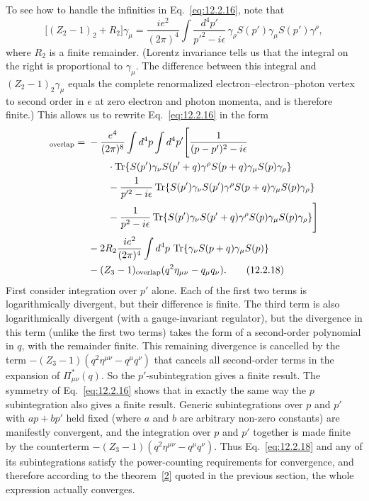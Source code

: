 To see how to handle the infinities in Eq.~\eqref{eq:12.2.16}, note that
\begin{equation}
  \bigl[(Z_2-1)_2+R_2\bigr]\gamma_\mu
  =\frac{i e^2}{(2\pi)^4}\int\frac{d^4p'}{p'^2-i\epsilon}\,
  \gamma_\rho S(p')\gamma_\mu S(p')\gamma^\rho,
  \tag{12.2.17}\label{eq:12.2.17}
\end{equation}
where $R_2$ is a finite remainder. (Lorentz invariance tells us that the
integral on the right is proportional to $\gamma_\mu$. The difference
between this integral and $(Z_2-1)_2\gamma_\mu$ equals the complete
renormalized electron--electron--photon vertex to second order in $e$ at
zero electron and photon momenta, and is therefore finite.) This allows us
to rewrite Eq.~\eqref{eq:12.2.16} in the form
\begin{align}
 [\Pi_{\mu\nu}^*(q)]_{\mathrm{overlap}}
 ={}&-\frac{e^4}{(2\pi)^8}\int d^4p\int d^4p'
 \Biggl[
 \frac{1}{(p-p')^2-i\epsilon}
 \notag\\
 &\qquad\cdot
 \operatorname{Tr}\!\left\{S(p')\gamma_\nu S(p'+q)\gamma^\rho
 S(p+q)\gamma_\mu S(p)\gamma_\rho\right\}
 \notag\\
 &\qquad-\frac{1}{p'^2-i\epsilon}
 \operatorname{Tr}\!\left\{S(p')\gamma_\nu S(p')\gamma^\rho
 S(p+q)\gamma_\mu S(p)\gamma_\rho\right\}
 \notag\\
 &\qquad-\frac{1}{p^2-i\epsilon}
 \operatorname{Tr}\!\left\{S(p')\gamma_\nu S(p'+q)\gamma^\rho
 S(p)\gamma_\mu S(p)\gamma_\rho\right\}
 \Biggr]
 \notag\\
 &-2R_2\frac{i e^2}{(2\pi)^4}\int d^4p\,
 \operatorname{Tr}\!\left\{\gamma_\nu S(p+q)\gamma_\mu S(p)\right\}
 \notag\\
 &-(Z_3-1)_{\mathrm{overlap}}
 (q^2\eta_{\mu\nu}-q_\mu q_\nu).
 \tag{12.2.18}\label{eq:12.2.18}
\end{align}
First consider integration over $p'$ alone. Each of the first two terms is
logarithmically divergent, but their difference is finite. The third term is
also logarithmically divergent (with a gauge-invariant regulator), but the
divergence in this term (unlike the first two terms) takes the form of a
second-order polynomial in $q$, with the remainder finite. This remaining
divergence is cancelled by the term
$-(Z_3-1)(q^2\eta^{\mu\nu}-q^\mu q^\nu)$ that cancels all second-order terms
in the expansion of $\Pi_{\mu\nu}^*(q)$. So the $p'$-subintegration gives a
finite result. The symmetry of Eq.~\eqref{eq:12.2.16} shows that in exactly
the same way the $p$ subintegration also gives a finite result. Generic
subintegrations over $p$ and $p'$ with $ap+bp'$ held fixed (where $a$ and
$b$ are arbitrary non-zero constants) are manifestly convergent, and the
integration over $p$ and $p'$ together is made finite by the counterterm
$-(Z_3-1)(q^2\eta^{\mu\nu}-q^\mu q^\nu)$. Thus Eq.~\eqref{eq:12.2.18} and any of its
subintegrations satisfy the power-counting requirements for convergence,
and therefore according to the theorem~\hyperref[ref:12.2]{[2]} quoted in
the previous section, the whole expression actually converges.

